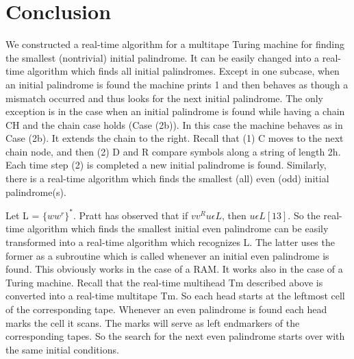 \documentclass[11pt,a4paper]{report}
\begin{document}
\chapter{Conclusion}


We constructed a real-time algorithm for a multitape Turing machine for finding the
smallest (nontrivial) initial palindrome. It can be easily changed into a real-time algorithm
which finds all initial palindromes. Except in one subcase, when an initial palindrome is
found the machine prints 1 and then behaves as though a mismatch occurred and thus
looks for the next initial palindrome. The only exception is in the case when an initial
palindrome is found while having a chain CH and the chain case holds (Case (2b)).
In this case the machine behaves as in Case (2b). It extends the chain to the right. Recall
that (1) C moves to the next chain node, and then (2) D and R compare symbols along a
string of length 2h. Each time step (2) is completed a new initial palindrome is found.
Similarly, there is a real-time algorithm which finds the smallest (all) even (odd) initial
palindrome(s).

Let L = $\{ww^r\}^*$. Pratt has observed that if $vv^Ru \epsilon  L$, then $u \epsilon L [13]$. So the real-time
algorithm which finds the smallest initial even palindrome can be easily transformed into
a real-time algorithm which recognizes L. The latter uses the former as a subroutine 
which is called whenever an initial even palindrome is found. This obviously works in
the case of a RAM. It works also in the case of a Turing machine. Recall that the real-time
multihead Tm described above is converted into a real-time multitape Tm. So each
head starts at the leftmost cell of the corresponding tape. Whenever an even palindrome is
found each head marks the cell it scans. The marks will serve as left endmarkers of the
corresponding tapes. So the search for the next even palindrome starts over with the same
initial conditions. 



\end{document}
